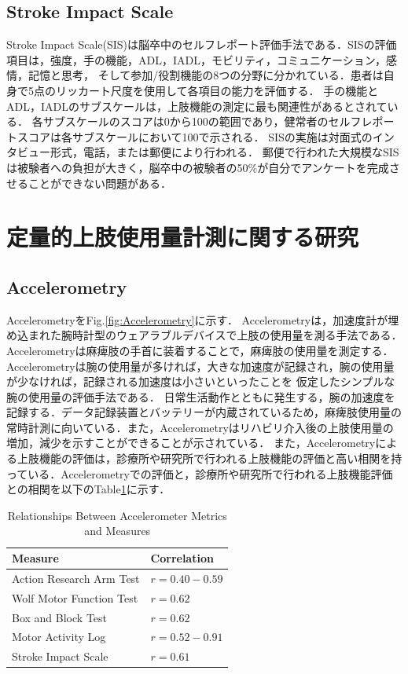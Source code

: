 \subsection*{Stroke Impact Scale}
Stroke Impact Scale(SIS)\cite{Lin2010b,Lin2010a,Lai2002,Duncan2001,Duncan2002,Duncan2003}は脳卒中のセルフレポート評価手法である．SISの評価項目は，強度，手の機能，ADL，IADL，モビリティ，コミュニケーション，感情，記憶と思考，
そして参加/役割機能の8つの分野に分かれている．患者は自身で5点のリッカート尺度を使用して各項目の能力を評価する．
手の機能とADL，IADLのサブスケールは，上肢機能の測定に最も関連性があるとされている．
各サブスケールのスコアは0から100の範囲であり，健常者のセルフレポートスコアは各サブスケールにおいて100で示される．
SISの実施は対面式のインタビュー形式，電話，または郵便により行われる．
郵便で行われた大規模なSISは被験者への負担が大きく，脳卒中の被験者の50\%が自分でアンケートを完成させることができない問題がある．

\section{定量的上肢使用量計測に関する研究}
\subsection*{Accelerometry}
Accelerometry\cite{Chen2005,Hayward2016,Dwiputra2017,VanDerPas2011,VanDerLee2004,Thrane2011,Seitz2011}をFig.\ref{fig:Accelerometry}に示す．
Accelerometryは，加速度計が埋め込まれた腕時計型のウェアラブルデバイスで上肢の使用量を測る手法である．Accelerometryは麻痺肢の手首に装着することで，麻痺肢の使用量を測定する．Accelerometryは腕の使用量が多ければ，大きな加速度が記録され，腕の使用量が少なければ，記録される加速度は小さいといったことを
仮定したシンプルな腕の使用量の評価手法である．
日常生活動作とともに発生する，腕の加速度を記録する．データ記録装置とバッテリーが内蔵されているため，麻痺肢使用量の常時計測に向いている\cite{VanDerPas2011}．また，Accelerometryはリハビリ介入後の上肢使用量の増加，減少を示すことができることが示されている\cite{Uswatte2006}．
また，Accelerometryによる上肢機能の評価は，診療所や研究所で行われる上肢機能の評価と高い相関を持っている．Accelerometryでの評価と，診療所や研究所で行われる上肢機能評価との相関を以下のTable\ref{table:measure}に示す．

\begin{table}[H]
  \caption{Relationships Between Accelerometer Metrics and Measures}
  \label{table:measure}
  \centering
  \begin{tabular}{ll}
    \hline
    Measure & Correlation\\
    \hline \hline
    Action Research Arm Test &$r = 0.40-0.59$\cite{Lang2007,Rand2012}\\
    Wolf Motor Function Test &$r = 0.62$\cite{Lang2007}\\
    Box and Block Test &$r = 0.62$\cite{Rand2012}\\
    Motor Activity Log &$r = 0.52-0.91$\cite{Uswatte2000,Uswatte2005,Uswatte2006}\\
    Stroke Impact Scale &$r = 0.61$\cite{Rand2012}\\
    \hline
  \end{tabular}
\end{table}

